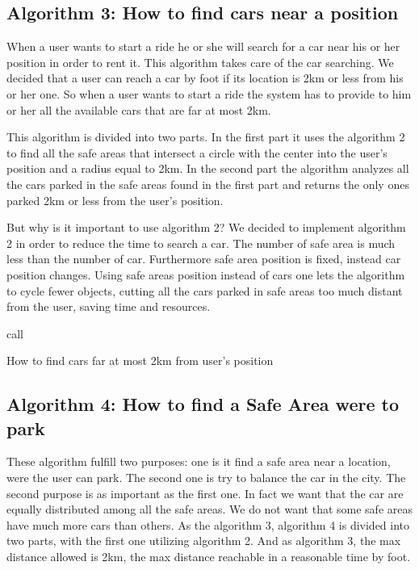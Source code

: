 \subsection{Algorithm 3: How to find cars near a position}
When a user wants to start a ride he or she will search for a car near his or her position in order to rent it. This algorithm takes care of the car searching.
We decided that a user can reach a car by foot if its location is 2km or less from his or her one. So when a user wants to start a ride the system has to provide to him or her all the available cars that are far at most 2km.

This algorithm is divided into two parts. In the first part it uses the algorithm 2 to find all the safe areas that intersect a circle with the center into the user's position and a radius equal to 2km. In the second part the algorithm analyzes all the cars parked in the safe areas found in the first part and returns the only ones parked 2km or less from the user's position.

But why is it important to use algorithm 2? We decided to implement algorithm 2 in order to reduce the time to search a car. The number of safe area is much less than the number of car. Furthermore safe area position is fixed, instead car position changes. Using safe areas position instead of cars one lets the algorithm to cycle fewer objects, cutting all the cars parked in safe areas too much distant from the user, saving time and resources.

\BlankLine
\begin{algorithm}[H]


	\BlankLine
	
call \;
\Return \Res \;
\caption{How to find cars far at most 2km from user's position}
\end{algorithm}


\subsection{Algorithm 4: How to find a Safe Area were to park}
These algorithm fulfill two purposes: one is it find a safe area near a location, were the user can park. The second one is try to balance the car in the city. The second purpose is as important as the first one. In fact we want that the car are equally distributed among all the safe areas. We do not want that some safe areas have much more cars than others.
As the algorithm 3, algorithm 4 is divided into two parts, with the first one utilizing algorithm 2. And as algorithm 3, the max distance allowed is 2km, the max distance reachable in a reasonable time by foot.

